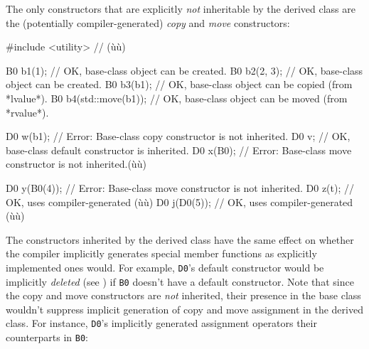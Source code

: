 \noindent The only constructors that are explicitly \emph{not} inheritable by the
derived class are the (potentially compiler-generated) \emph{copy} and
\emph{move} constructors:

\begin{emcppslisting}[language=C++]
#include <utility>  // (ù{}ù)

B0 b1(1);              // OK, base-class object can be created.
B0 b2(2, 3);           // OK, base-class object can be created.
B0 b3(b1);             // OK, base-class object can be copied (from *lvalue*).
B0 b4(std::move(b1));  // OK, base-class object can be moved (from *rvalue*).

D0 w(b1);    // Error: Base-class copy constructor is not inherited.
D0 v;        // OK, base-class default constructor is inherited.
D0 x(B0{});  // Error: Base-class move constructor is not inherited.(ù{\footnotemark}ù)

D0 y(B0(4));  // Error: Base-class move constructor is not inherited.
D0 z(t);      // OK, uses compiler-generated (ù{}ù)
D0 j(D0(5));  // OK, uses compiler-generated (ù{}ù)
\end{emcppslisting}
{\cprotect{}}
    
\noindent The constructors inherited by the derived class have the same effect on
whether the compiler implicitly generates special member functions as
explicitly implemented ones would. For example, \lstinline!D0!'s default
constructor would be implicitly \emph{deleted} (see ) 
if
\lstinline!B0! doesn't have a default constructor. Note that since the copy
and move constructors are \emph{not} inherited, their presence in the
base class wouldn't suppress implicit generation of copy and move
assignment in the derived class. For instance, \lstinline!D0!'s implicitly
generated assignment operators  their
counterparts in \lstinline!B0!:

